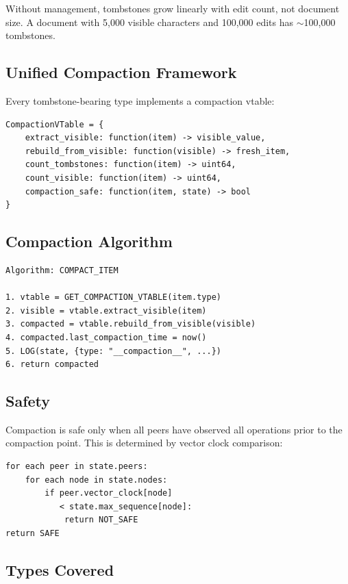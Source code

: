 \documentclass[11pt,a4paper]{article}
\begin{document}
Without management, tombstones grow linearly with edit count, not document size. A document with 5,000 visible characters and 100,000 edits has $\sim$100,000 tombstones.

\subsection{Unified Compaction Framework}

Every tombstone-bearing type implements a compaction vtable:

\begin{lstlisting}
CompactionVTable = {
    extract_visible: function(item) -> visible_value,
    rebuild_from_visible: function(visible) -> fresh_item,
    count_tombstones: function(item) -> uint64,
    count_visible: function(item) -> uint64,
    compaction_safe: function(item, state) -> bool
}
\end{lstlisting}

\subsection{Compaction Algorithm}

\begin{lstlisting}
Algorithm: COMPACT_ITEM

1. vtable = GET_COMPACTION_VTABLE(item.type)
2. visible = vtable.extract_visible(item)
3. compacted = vtable.rebuild_from_visible(visible)
4. compacted.last_compaction_time = now()
5. LOG(state, {type: "__compaction__", ...})
6. return compacted
\end{lstlisting}

\subsection{Safety}

Compaction is safe only when all peers have observed all operations prior to the compaction point. This is determined by vector clock comparison:

\begin{lstlisting}
for each peer in state.peers:
    for each node in state.nodes:
        if peer.vector_clock[node]
           < state.max_sequence[node]:
            return NOT_SAFE
return SAFE
\end{lstlisting}

\subsection{Types Covered}
\end{document}
